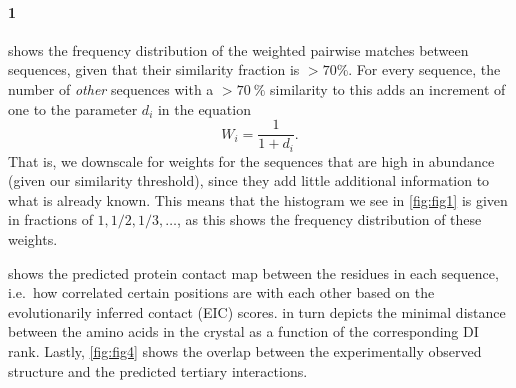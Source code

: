 \documentclass[11pt]{article}\usepackage[]{graphicx}\usepackage[]{color}
\theoremstyle{plain}
\begin{document}
\begin{multicols*}{2}
\paragraph{1}
 shows the frequency distribution of the weighted pairwise matches between sequences, given that their similarity fraction is $> 70 \%$. For every sequence, the number of \textit{other} sequences with a $> 70~\%$ similarity to this adds an increment of one to the parameter $d_i$ in the equation 
\begin{equation*}
  W_i = \dfrac{1}{1 + d_i}.
\end{equation*}
 That is, we downscale for weights for the sequences that are high in abundance (given our similarity threshold), since they add little additional information to what is already known. This means that the histogram we see in \cref{fig:fig1} is given in fractions of $1, 1/2, 1/3, \ldots$, as this shows the frequency distribution of these weights.

 shows the predicted protein contact map between the residues in each sequence, i.e.\ how correlated certain positions are with each other based on the evolutionarily inferred contact (EIC) scores.  in turn depicts the minimal distance between the amino acids in the crystal as a function of the corresponding DI rank. Lastly, \cref{fig:fig4} shows the overlap between the experimentally observed structure and the predicted tertiary  interactions.  


\end{multicols*}
\end{document}
